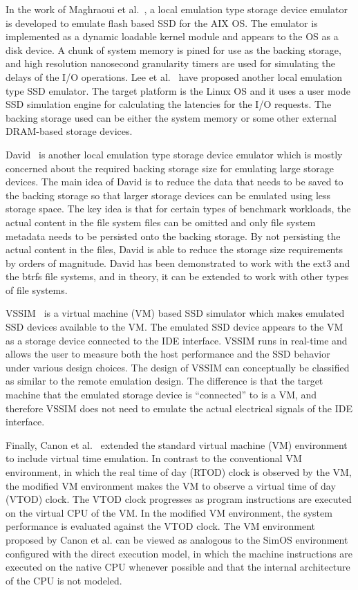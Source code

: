 In the work of Maghraoui et al.~\cite{ElMaghraoui:2010}, a local emulation type storage device emulator is developed to emulate flash based SSD for the AIX OS. The emulator is implemented as a dynamic loadable kernel module and appears to the OS as a disk device. A chunk of system memory is pined for use as the backing storage, and high resolution nanosecond granularity timers are used for simulating the delays of the I/O operations. Lee et al.~\cite{Lee:2012} have proposed another local emulation type SSD emulator. The target platform is the Linux OS and it uses a user mode SSD simulation engine for calculating the latencies for the I/O requests. The backing storage used can be either the system memory or some other external DRAM-based storage devices.

David~\cite{Agrawal:2012} is another local emulation type storage device emulator which is mostly concerned about the required backing storage size for emulating large storage devices. The main idea of David is to reduce the data that needs to be saved to the backing storage so that larger storage devices can be emulated using less storage space. The key idea is that for certain types of benchmark workloads, the actual content in the file system files can be omitted and only file system metadata needs to be persisted onto the backing storage. By not persisting the actual content in the files, David is able to reduce the storage size requirements by orders of magnitude. David has been demonstrated to work with the ext3 and the btrfs file systems, and in theory, it can be extended to work with other types of file systems.

VSSIM~\cite{Yoo:2013} is a virtual machine (VM) based SSD simulator which makes emulated SSD devices available to the VM. The emulated SSD device appears to the VM as a storage device connected to the IDE interface. VSSIM runs in real-time and allows the user to measure both the host performance and the SSD behavior under various design choices. The design of VSSIM can conceptually be classified as similar to the remote emulation design. The difference is that the target machine that the emulated storage device is ``connected'' to is a VM, and therefore VSSIM does not need to emulate the actual electrical signals of the IDE interface.

Finally, Canon et al.~\cite{Canon:1980} extended the standard virtual machine (VM) environment to include virtual time emulation. In contrast to the conventional VM environment, in which the real time of day (RTOD) clock is observed by the VM, the modified VM environment makes the VM to observe a virtual time of day (VTOD) clock. The VTOD clock progresses as program instructions are executed on the virtual CPU of the VM. In the modified VM environment, the system performance is evaluated against the VTOD clock. The VM environment proposed by Canon et al. can be viewed as analogous to the SimOS environment configured with the direct execution model, in which the machine instructions are executed on the native CPU whenever possible and that the internal architecture of the CPU is not modeled.
